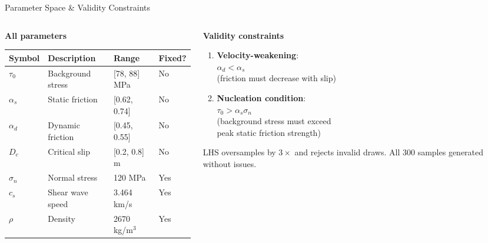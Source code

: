 \documentclass[aspectratio=169,12pt]{beamer}
\begin{document}
\begin{frame}{Parameter Space \& Validity Constraints}
  \begin{columns}[T]
    \begin{column}{0.50\textwidth}
      \textbf{All parameters}
      \begin{center}
      \small
      \begin{tabular}{llll}
        \toprule
        Symbol & Description & Range & Fixed? \\
        \midrule
        $\tau_0$    & Background stress & [78, 88] MPa & No \\
        $\alpha_s$  & Static friction   & [0.62, 0.74] & No \\
        $\alpha_d$  & Dynamic friction  & [0.45, 0.55] & No \\
        $D_c$       & Critical slip     & [0.2, 0.8] m & No \\
        $\sigma_n$  & Normal stress     & 120 MPa      & Yes \\
        $c_s$       & Shear wave speed  & 3.464 km/s   & Yes \\
        $\rho$      & Density           & 2670 kg/m$^3$& Yes \\
        \bottomrule
      \end{tabular}
      \end{center}
    \end{column}
    \begin{column}{0.46\textwidth}
      \textbf{Validity constraints}
      \begin{enumerate}
        \item \textbf{Velocity-weakening}:\\
          $\alpha_d < \alpha_s$\\
          (friction must decrease with slip)
        \item \textbf{Nucleation condition}:\\
          $\tau_0 > \alpha_s \sigma_n$\\
          (background stress must exceed\\ peak static friction strength)
      \end{enumerate}
      \vspace{6pt}
      LHS oversamples by $3\times$ and rejects invalid draws. All 300 samples generated without issues.
    \end{column}
  \end{columns}
\end{frame}
\end{document}
